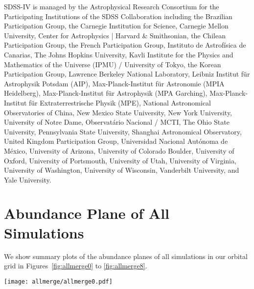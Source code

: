 \documentclass[linenumbers, twocolumn]{aastex631}
\newcommand{\FeH}{\ensuremath{[\textrm{Fe}/\textrm{H}]}}
\newcommand{\MgFe}{\ensuremath{[\textrm{Mg}/\textrm{Fe}]}}
\begin{document}
\begin{acknowledgements}
SDSS-IV is managed by the 
Astrophysical Research Consortium 
for the Participating Institutions 
of the SDSS Collaboration including 
the Brazilian Participation Group, 
the Carnegie Institution for Science, 
Carnegie Mellon University, Center for 
Astrophysics | Harvard \& 
Smithsonian, the Chilean Participation 
Group, the French Participation Group, 
Instituto de Astrof\'isica de 
Canarias, The Johns Hopkins 
University, Kavli Institute for the 
Physics and Mathematics of the 
Universe (IPMU) / University of 
Tokyo, the Korean Participation Group, 
Lawrence Berkeley National Laboratory, 
Leibniz Institut f\"ur Astrophysik 
Potsdam (AIP),  Max-Planck-Institut 
f\"ur Astronomie (MPIA Heidelberg), 
Max-Planck-Institut f\"ur 
Astrophysik (MPA Garching), 
Max-Planck-Institut f\"ur 
Extraterrestrische Physik (MPE), 
National Astronomical Observatories of 
China, New Mexico State University, 
New York University, University of 
Notre Dame, Observat\'ario 
Nacional / MCTI, The Ohio State 
University, Pennsylvania State 
University, Shanghai 
Astronomical Observatory, United 
Kingdom Participation Group, 
Universidad Nacional Aut\'onoma 
de M\'exico, University of Arizona, 
University of Colorado Boulder, 
University of Oxford, University of 
Portsmouth, University of Utah, 
University of Virginia, University 
of Washington, University of 
Wisconsin, Vanderbilt University, 
and Yale University.

\end{acknowledgements}

{}


\appendix
\section{Abundance Plane of All Simulations}\label{app:allmerge}
We show summary plots of the abundance planes of all simulations in our orbital grid in Figures~\ref{fig:allmerge0} to \ref{fig:allmerge8}.

\begin{figure*}
  \centering
  \texttt{[image: allmerge/allmerge0.pdf]}
  \caption{A summary of the abundance plane and star formation history of all simulations within the orbital grid. Each figure shows the outcome of a simulation at a fixed $R_0$ and $V_0$, varying $\eta$. The title of each column shows the $R_0$, $V_0$, and $\eta$ of that simulation, in order. The upper and middle rows replicate Figure~\ref{fig:fig1}, which show the distribution of stars in the abundance plane of \MgFe{}-\FeH{} as well as 1D histograms at a fixed \FeH{} of $-0.5$, $-0.25$, $0$, and $0.25$. The lower rows replicate Figure~\ref{fig:before_after_sfh_by_iron}, showing the star formation history at each \FeH{}.}
  \label{fig:allmerge0}
\end{figure*}
\end{document}
